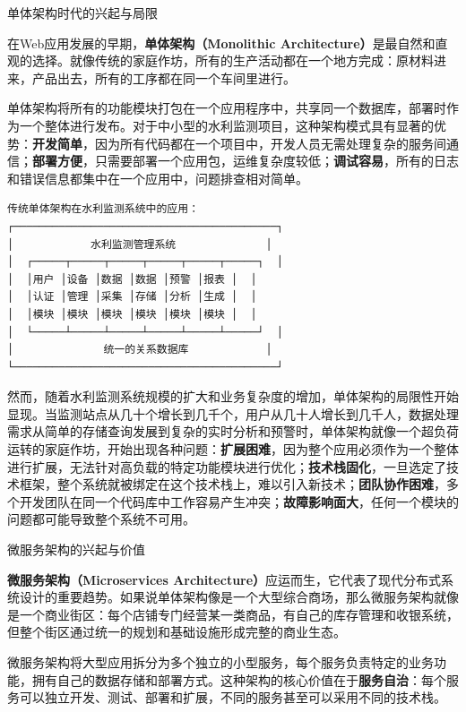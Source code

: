  单体架构时代的兴起与局限

在Web应用发展的早期，\textbf{单体架构（Monolithic Architecture）}是最自然和直观的选择。就像传统的家庭作坊，所有的生产活动都在一个地方完成：原材料进来，产品出去，所有的工序都在同一个车间里进行。

单体架构将所有的功能模块打包在一个应用程序中，共享同一个数据库，部署时作为一个整体进行发布。对于中小型的水利监测项目，这种架构模式具有显著的优势：\textbf{开发简单}，因为所有代码都在一个项目中，开发人员无需处理复杂的服务间通信；\textbf{部署方便}，只需要部署一个应用包，运维复杂度较低；\textbf{调试容易}，所有的日志和错误信息都集中在一个应用中，问题排查相对简单。

\begin{lstlisting}
传统单体架构在水利监测系统中的应用：
┌─────────────────────────────────────────┐
│            水利监测管理系统              │
│  ┌─────┬─────┬─────┬─────┬─────┬─────┐  │
│  │用户 │设备 │数据 │数据 │预警 │报表 │  │
│  │认证 │管理 │采集 │存储 │分析 │生成 │  │
│  │模块 │模块 │模块 │模块 │模块 │模块 │  │
│  └─────┴─────┴─────┴─────┴─────┴─────┘  │
│              统一的关系数据库            │
└─────────────────────────────────────────┘
\end{lstlisting}

然而，随着水利监测系统规模的扩大和业务复杂度的增加，单体架构的局限性开始显现。当监测站点从几十个增长到几千个，用户从几十人增长到几千人，数据处理需求从简单的存储查询发展到复杂的实时分析和预警时，单体架构就像一个超负荷运转的家庭作坊，开始出现各种问题：\textbf{扩展困难}，因为整个应用必须作为一个整体进行扩展，无法针对高负载的特定功能模块进行优化；\textbf{技术栈固化}，一旦选定了技术框架，整个系统就被绑定在这个技术栈上，难以引入新技术；\textbf{团队协作困难}，多个开发团队在同一个代码库中工作容易产生冲突；\textbf{故障影响面大}，任何一个模块的问题都可能导致整个系统不可用。

 微服务架构的兴起与价值

\textbf{微服务架构（Microservices Architecture）}应运而生，它代表了现代分布式系统设计的重要趋势。如果说单体架构像是一个大型综合商场，那么微服务架构就像是一个商业街区：每个店铺专门经营某一类商品，有自己的库存管理和收银系统，但整个街区通过统一的规划和基础设施形成完整的商业生态。

微服务架构将大型应用拆分为多个独立的小型服务，每个服务负责特定的业务功能，拥有自己的数据存储和部署方式。这种架构的核心价值在于\textbf{服务自治}：每个服务可以独立开发、测试、部署和扩展，不同的服务甚至可以采用不同的技术栈。

